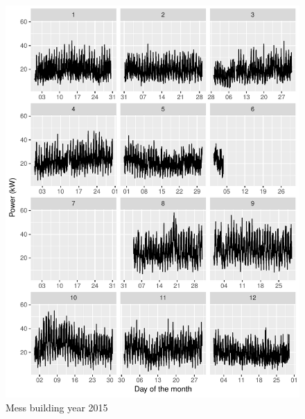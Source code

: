 \documentclass[11pt, oneside]{article}   	%
\begin{document}
\begin{figure}
\includegraphics[keepaspectratio]{mess_build_Y2015.pdf}
\caption{Mess building year 2015 }
\end{figure}
\end{document}
